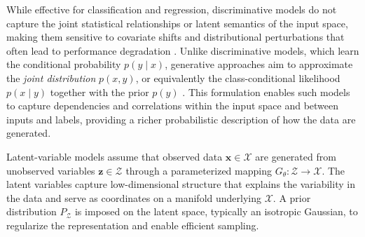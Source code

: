 While effective for classification and regression, discriminative models do not capture the joint statistical relationships or latent semantics of the input space, making them sensitive to covariate shifts and distributional perturbations that often lead to performance degradation \citep{fetaya2019understanding}.
Unlike discriminative models, which learn the conditional probability $p(y \mid x)$, generative approaches aim to approximate the \emph{joint distribution} $p(x, y)$, or equivalently the class-conditional likelihood $p(x \mid y)$ together with the prior $p(y)$ \citep{NIPS2001_7b7a53e2,fetaya2019understanding}. 
This formulation enables such models to capture dependencies and correlations within the input space and between inputs and labels, providing a richer probabilistic description of how the data are generated.


Latent-variable models assume that observed data \(\mathbf{x} \in \mathcal{X}\) are generated from unobserved variables \(\mathbf{z} \in \mathcal{Z}\) through a parameterized mapping \(G_{\theta}: \mathcal{Z} \rightarrow \mathcal{X}\).  
The latent variables capture low-dimensional structure that explains the variability in the data and serve as coordinates on a manifold underlying \(\mathcal{X}\).  
A prior distribution \(P_{\mathcal{Z}}\) is imposed on the latent space, typically an isotropic Gaussian, to regularize the representation and enable efficient sampling.  



